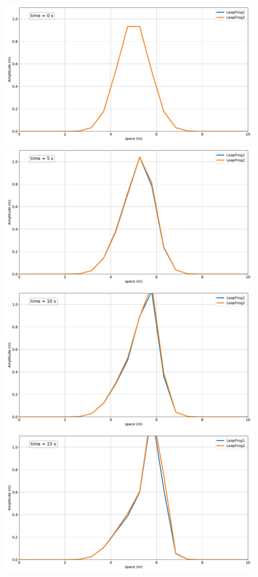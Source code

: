 \includegraphics[width=\linewidth]{../BurgersEquation/images/Lin3_Lin40.pdf}
\includegraphics[width=\linewidth]{../BurgersEquation/images/Lin3_Lin41.pdf}
\includegraphics[width=\linewidth]{../BurgersEquation/images/Lin3_Lin42.pdf}
\includegraphics[width=\linewidth]{../BurgersEquation/images/Lin3_Lin43.pdf}
